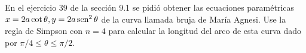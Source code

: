 \item En el ejercicio 39 de la sección 9.1 se pidió obtener las ecuaciones paramétricas $x = 2a \cot \theta, y = 2a \operatorname{sen}^2 \theta$ de la curva llamada bruja de María Agnesi. Use la regla de Simpson con $n = 4$ para calcular la longitud del arco de esta curva dado por $\pi/4 \le \theta \le \pi/2$.
